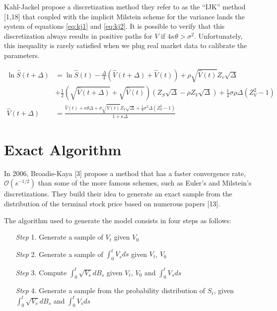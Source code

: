 \documentclass[12pt,twoside]{reedthesis}
\theoremstyle{definition}
\theoremstyle{definition}
\theoremstyle{remark}
\begin{document}
  Kahl-Jackel propose a discretization method they refer to as the ``IJK''
  method {[}1,18{]} that coupled with the implicit Milstein scheme for the
  variance lands the system of equations \eqref{eq:kj1} and \eqref{eq:kj2}. It
  is possible to verify that this discretization always results in
  positive paths for \(V\) if \(4 \kappa \theta > \sigma^2\).
  Unfortunately, this inequality is rarely satisfied when we plug real
  market data to calibrate the parameters.
  \begin{small}
  \begin{align}
  \label{eq:kj1}
  \ln \hat{S}(t + \Delta) &= \ln \hat{S}(t) - \frac{\Delta}{4}\left( \hat{V}(t+\Delta) + \hat{V}(t) \right) + \rho \sqrt{\hat{V}(t)}Z_v\sqrt{\Delta} \\ \nonumber
  &+ \frac{1}{2} \left( \sqrt{\hat{V}(t+\Delta)} + \sqrt{\hat{V}(t)} \right) \left( Z_S \sqrt{\Delta} - \rho Z_V \sqrt{\Delta}\right) + \frac{1}{4} \sigma \rho \Delta \left( Z_{V}^{2} - 1 \right) \\
  \label{eq:kj2}
  \hat{V}(t+\Delta) &= \frac{\hat{V}(t) + \kappa \theta \Delta + \sigma \sqrt{\hat{V}(t)}Z_V \sqrt{\Delta}+ \frac{1}{4}\sigma^2 \Delta \left(Z_V^2-1 \right)}{1+ \kappa \Delta}
  \end{align}
  \end{small}
  \section{Exact Algorithm}\label{exact-algorithm}
  
  In 2006, Broadie-Kaya {[}3{]} propose a method that has a faster
  convergence rate, \(\mathcal{O} \left( s^{-1/2} \right)\) than some of
  the more famous schemes, such as Euler's and Milstein's discretizations.
  They build their idea to generate an exact sample from the distribution
  of the terminal stock price based on numerous papers {[}13{]}.
  
  The algorithm used to generate the model consists in four steps as
  follows:
  \begin{itemize}
  \item [\textit{Step} 1.] Generate a sample of $V_t$ given $V_0$
  \item [\textit{Step} 2.] Generate a sample of $\int_0^t V_sds$ given $V_t$, $V_0$
  \item [\textit{Step} 3.] Compute $\int_0^t \sqrt{V_s}dB_s$ given $V_t$, $V_0$ and $\int_0^t V_sds$
  \item [\textit{Step} 4.] Generate a sample from the probability distribution of $S_t$, given $\int_0^t \sqrt{V_s}dB_s$ and $\int_0^t V_sds$
  \end{itemize}
  \clearpage
  
\end{document}
